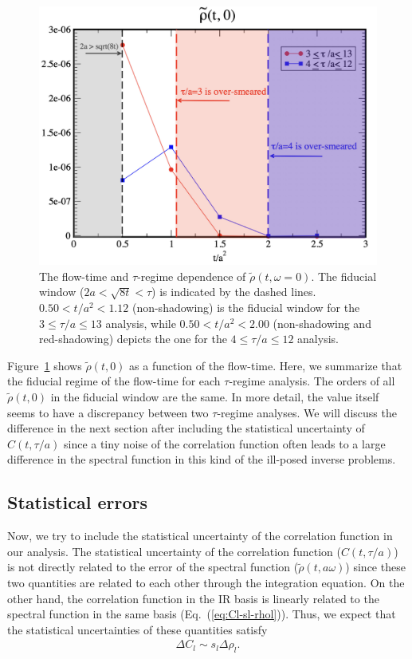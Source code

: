 \documentclass[a4paper,11pt]{article}
\newcommand\beq{ \begin{eqnarray} }
\newcommand\eeq{ \end{eqnarray} }
\begin{document}
\begin{figure}[h]
\begin{center}
\includegraphics[scale=0.35]{./rho0-center-ft-deps-with-shadow.pdf}
\caption{The flow-time and $\tau$-regime dependence of $\tilde{\rho}(t,\omega=0)$. The fiducial window ($2a < \sqrt{8t} < \tau$)  is indicated
by the dashed lines. $0.50 < t/a^2 < 1.12$ (non-shadowing) is the fiducial window for the  $3 \le \tau/a \le 13$ analysis, while $0.50 < t/a^2 < 2.00$ (non-shadowing and red-shadowing) depicts the one for the $4 \le \tau/a \le 12$ analysis.   }
\label{fig:rho0-ft-deps}
\end{center}
\end{figure}
Figure~\ref{fig:rho0-ft-deps} shows $\tilde{\rho}(t,0)$ as a function of the flow-time.
Here, we summarize that the fiducial regime of the flow-time for each $\tau$-regime analysis.
The orders of all $\tilde{\rho} (t,0)$ in the fiducial window are the same.
In more detail, the value itself seems to have a discrepancy between two $\tau$-regime analyses. 
We will discuss the difference in the next section after including the statistical uncertainty of $C(t,\tau/a)$ since a tiny noise of the correlation function often leads to a large difference in the spectral function in this kind of the ill-posed inverse problems. 



\subsection{Statistical errors }\label{sec:stat-error}
Now, we try to include the statistical uncertainty of the correlation function in our analysis.
The statistical uncertainty of the correlation function ($C(t,\tau/a)$) is not directly related to the error of the spectral function ($\tilde{\rho}(t,a\omega)$) since these two quantities are related to each other through the integration equation.
On the other hand, the correlation function in the IR basis is linearly related to the spectral function in the same basis (Eq.~(\ref{eq:Cl-sl-rhol})).
Thus, we expect that the statistical uncertainties of these quantities satisfy
\beq
\Delta C_l \sim s_l \Delta \rho_l.\label{eq:error-Cl-rhol}
\eeq
\end{document}
